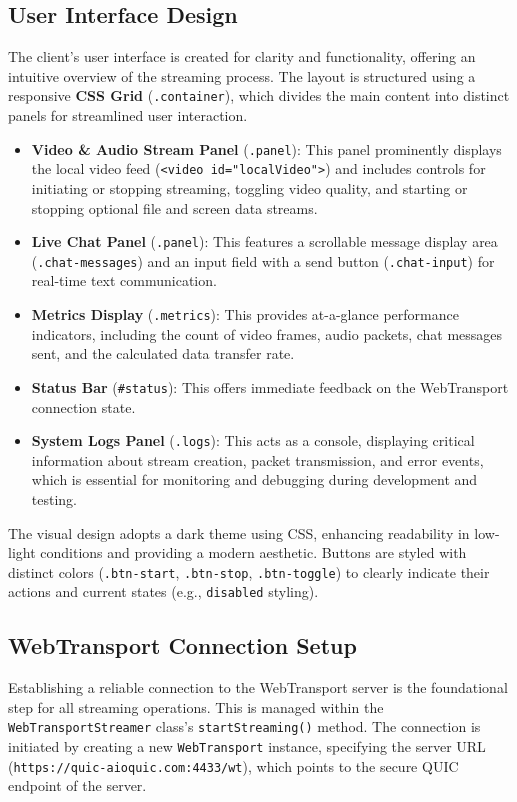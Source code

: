 \subsection{User Interface Design}
The client's user interface is created for clarity and functionality, offering an intuitive overview of the streaming process. The layout is structured using a responsive \textbf{CSS Grid} (\texttt{.container}), which divides the main content into distinct panels for streamlined user interaction.

\begin{itemize}
    \item \textbf{Video \& Audio Stream Panel} (\texttt{.panel}): This panel prominently displays the local video feed (\texttt{<video id="localVideo">}) and includes controls for initiating or stopping streaming, toggling video quality, and starting or stopping optional file and screen data streams.
    \item \textbf{Live Chat Panel} (\texttt{.panel}): This features a scrollable message display area (\texttt{.chat-messages}) and an input field with a send button (\texttt{.chat-input}) for real-time text communication.
    \item \textbf{Metrics Display} (\texttt{.metrics}): This provides at-a-glance performance indicators, including the count of video frames, audio packets, chat messages sent, and the calculated data transfer rate.
    \item \textbf{Status Bar} (\texttt{\#status}): This offers immediate feedback on the WebTransport connection state.
    \item \textbf{System Logs Panel} (\texttt{.logs}): This acts as a console, displaying critical information about stream creation, packet transmission, and error events, which is essential for monitoring and debugging during development and testing.
\end{itemize}

The visual design adopts a dark theme using CSS, enhancing readability in low-light conditions and providing a modern aesthetic. Buttons are styled with distinct colors (\texttt{.btn-start}, \texttt{.btn-stop}, \texttt{.btn-toggle}) to clearly indicate their actions and current states (e.g., \texttt{disabled} styling).

\subsection{WebTransport Connection Setup}
Establishing a reliable connection to the WebTransport server is the foundational step for all streaming operations. This is managed within the \texttt{WebTransportStreamer} class's \texttt{startStreaming()} method. The connection is initiated by creating a new \texttt{WebTransport} instance, specifying the server URL (\texttt{https://quic-aioquic.com:4433/wt}), which points to the secure QUIC endpoint of the server.


